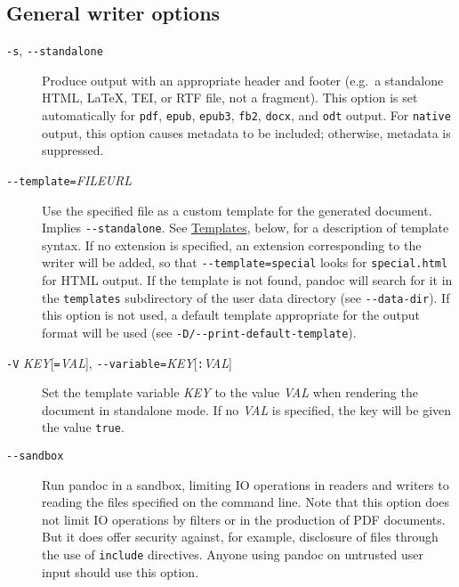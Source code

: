 \hypertarget{general-writer-options}{%
\subsection{General writer options}\label{general-writer-options}}

\begin{description}
\item[\texttt{-s}, \texttt{-\/-standalone}]
Produce output with an appropriate header and footer (e.g.~a standalone
HTML, LaTeX, TEI, or RTF file, not a fragment). This option is set
automatically for \texttt{pdf}, \texttt{epub}, \texttt{epub3},
\texttt{fb2}, \texttt{docx}, and \texttt{odt} output. For
\texttt{native} output, this option causes metadata to be included;
otherwise, metadata is suppressed.
\item[\texttt{-\/-template=}\emph{FILE}\textbar{}\emph{URL}]
Use the specified file as a custom template for the generated document.
Implies \texttt{-\/-standalone}. See
\protect\hyperlink{templates}{Templates}, below, for a description of
template syntax. If no extension is specified, an extension
corresponding to the writer will be added, so that
\texttt{-\/-template=special} looks for \texttt{special.html} for HTML
output. If the template is not found, pandoc will search for it in the
\texttt{templates} subdirectory of the user data directory (see
\texttt{-\/-data-dir}). If this option is not used, a default template
appropriate for the output format will be used (see
\texttt{-D/-\/-print-default-template}).
\item[\texttt{-V} \emph{KEY}{[}\texttt{=}\emph{VAL}{]},
\texttt{-\/-variable=}\emph{KEY}{[}\texttt{:}\emph{VAL}{]}]
Set the template variable \emph{KEY} to the value \emph{VAL} when
rendering the document in standalone mode. If no \emph{VAL} is
specified, the key will be given the value \texttt{true}.
\item[\texttt{-\/-sandbox}]
Run pandoc in a sandbox, limiting IO operations in readers and writers
to reading the files specified on the command line. Note that this
option does not limit IO operations by filters or in the production of
PDF documents. But it does offer security against, for example,
disclosure of files through the use of \texttt{include} directives.
Anyone using pandoc on untrusted user input should use this option.


\end{description}
